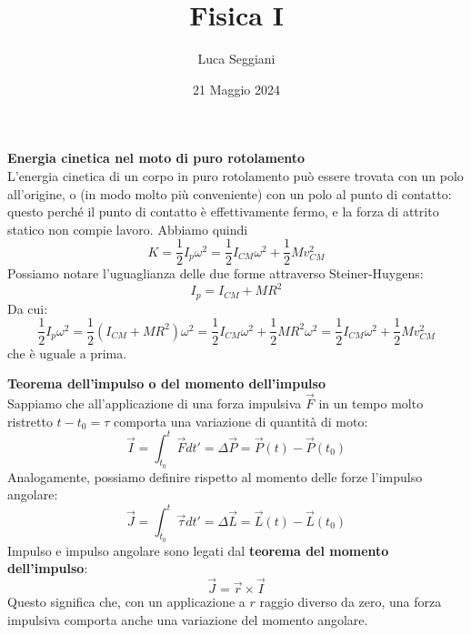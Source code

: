 \documentclass[a4paper,12pt]{article}
\title{Fisica I}
\author{Luca Seggiani}
\date{21 Maggio 2024}
\begin{document}
\maketitle
\par\smallskip
\textbf{Energia cinetica nel moto di puro rotolamento} \\
L'energia cinetica di un corpo in puro rotolamento può essere trovata con un polo all'origine, o (in modo molto più conveniente) con un polo al punto di contatto:
questo perché il punto di contatto è effettivamente fermo, e la forza di attrito statico non compie lavoro. Abbiamo quindi 
$$ K = \frac{1}{2}I_p\omega^2 = \frac{1}{2} I_{CM}\omega^2 + \frac{1}{2}Mv_{CM}^2 $$
Possiamo notare l'uguaglianza delle due forme attraverso Steiner-Huygens:
$$ I_p = I_{CM} + MR^2$$
Da cui:
$$ \frac{1}{2}I_p\omega^2 = \frac{1}{2}(I_{CM} + MR^2)\omega^2 = \frac{1}{2}I_{CM}\omega^2 + \frac{1}{2}MR^2\omega^2 = \frac{1}{2}I_{CM}\omega^2 + \frac{1}{2}Mv_{CM}^2 $$
che è uguale a prima.

\par\smallskip
\textbf{Teorema dell'impulso o del momento dell'impulso} \\
Sappiamo che all'applicazione di una forza impulsiva $\vec{F}$ in un tempo molto ristretto $t - t_0 = \tau$ comporta
una variazione di quantità di moto:
$$ \vec{I} = \int_{t_0}^t \vec{F}dt' = \Delta \vec{P} = \vec{P}(t) - \vec{P}(t_0) $$
Analogamente, possiamo definire rispetto al momento delle forze l'impulso angolare:
$$ \vec{J} = \int_{t_0}^t \vec{\tau}dt' = \Delta \vec{L} = \vec{L}(t) - \vec{L}(t_0) $$
Impulso e impulso angolare sono legati dal \textbf{teorema del momento dell'impulso}:
$$ \vec{J} = \vec{r} \times \vec{I} $$
Questo significa che, con un applicazione a $r$ raggio diverso da zero, una forza impulsiva comporta anche una
variazione del momento angolare.
\end{document}
